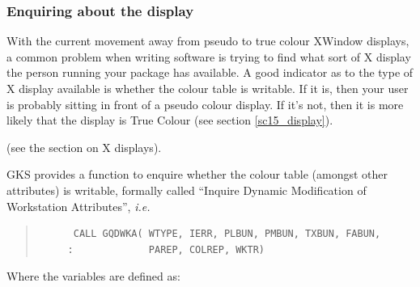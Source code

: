 \documentclass[twoside,11pt]{article}
\newcommand{\htmlref}[2]{#1}
\newcommand{\latex}[1]{#1}
\newcommand{\xref}[3]{#1}
\begin{document}


\subsubsection{Enquiring about the display}

With the current movement away from pseudo to true colour XWindow displays, a common problem when writing software is trying to find what sort of X display
the person running your package has available. A good indicator as to the type of X display available is whether the colour table is writable. If it is, then your user is probably sitting in front of a pseudo colour display. If it's not, then it is more likely that the display is True Colour \latex{ (see section \ref{sc15_display}).}
\begin{htmlonly}
(see the section on \htmlref{X displays}{sc15_display}).
\end{htmlonly}

GKS provides a function to enquire whether the colour table (amongst other attributes) is writable, formally called ``Inquire Dynamic Modification of Workstation Attributes'', {\em i.e.\ }

\small
\begin{quote}
\begin{verbatim}
      CALL GQDWKA( WTYPE, IERR, PLBUN, PMBUN, TXBUN, FABUN,
     :             PAREP, COLREP, WKTR)
\end{verbatim}
\end{quote}
\normalsize

Where the variables are defined as:
\end{document}
